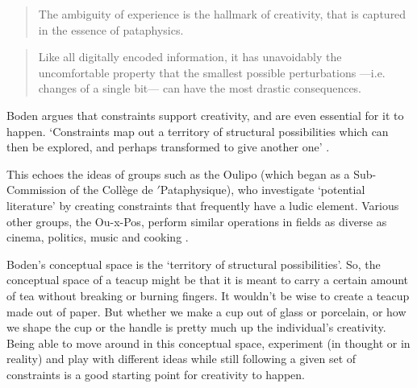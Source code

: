 \begin{quotation}
  The ambiguity of experience is the hallmark of creativity, that is captured in the essence of pataphysics. 
\end{quotation}

\begin{quotation}
  Like all digitally encoded information, it has unavoidably the uncomfortable property that the smallest possible perturbations —i.e. changes of a single bit— can have the most drastic consequences. 
\end{quotation}



\begin{leftbar}
Boden argues that constraints support creativity, and are even essential for it to happen. `Constraints map out a territory of structural possibilities which can then be explored, and perhaps transformed to give another one' \autocite[p.82]{Boden2003}.
\end{leftbar}

\begin{leftbar}
This echoes the ideas of groups such as the Oulipo (which began as a Sub-Commission of the Collège de $'$Pataphysique), who investigate `potential literature' by creating constraints that frequently have a ludic element. Various other groups, the Ou-x-Pos, perform similar operations in fields as diverse as cinema, politics, music and cooking \autocite{Motte2007}.
\end{leftbar}

\begin{leftbar}
Boden's conceptual space is the `territory of structural possibilities'. So, the conceptual space of a teacup might be that it is meant to carry a certain amount of tea without breaking or burning fingers. It wouldn't be wise to create a teacup made out of paper. But whether we make a cup out of glass or porcelain, or how we shape the cup or the handle is pretty much up the individual's creativity. Being able to move around in this conceptual space, experiment (in thought or in reality) and play with different ideas while still following a given set of constraints is a good starting point for creativity to happen.
\end{leftbar}

